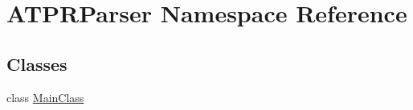\hypertarget{namespace_a_t_p_r_parser}{}\section{A\+T\+P\+R\+Parser Namespace Reference}
\label{namespace_a_t_p_r_parser}
\subsection*{Classes}
\begin{DoxyCompactItemize}
\item 
class \hyperlink{class_a_t_p_r_parser_1_1_main_class}{Main\+Class}
\end{DoxyCompactItemize}
